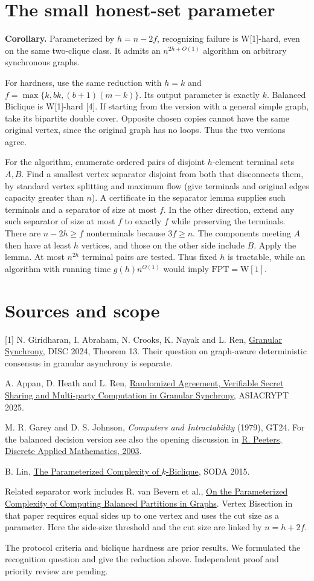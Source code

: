 \documentclass[11pt]{article}
\begin{document}
\section{The small honest-set parameter}
\textbf{Corollary.} Parameterized by $h=n-2f$, recognizing failure is W[1]-hard, even on the same two-clique class. It admits an $n^{2h+O(1)}$ algorithm on arbitrary synchronous graphs.

For hardness, use the same reduction with $h=k$ and
$f=\max\{k,bk,(b+1)(m-k)\}$. Its output parameter is exactly $k$. Balanced Biclique is W[1]-hard [4]. If starting from the version with a general simple graph, take its bipartite double cover. Opposite chosen copies cannot have the same original vertex, since the original graph has no loops. Thus the two versions agree.

For the algorithm, enumerate ordered pairs of disjoint $h$-element terminal sets $A,B$. Find a smallest vertex separator disjoint from both that disconnects them, by standard vertex splitting and maximum flow (give terminals and original edges capacity greater than $n$). A certificate in the separator lemma supplies such terminals and a separator of size at most $f$. In the other direction, extend any such separator of size at most $f$ to exactly $f$ while preserving the terminals. There are $n-2h\ge f$ nonterminals because $3f\ge n$. The components meeting $A$ then have at least $h$ vertices, and those on the other side include $B$. Apply the lemma. At most $n^{2h}$ terminal pairs are tested. Thus fixed $h$ is tractable, while an algorithm with running time $g(h)n^{O(1)}$ would imply $\mathrm{FPT}=\mathrm{W}[1]$.

\section*{Sources and scope}
[1] N. Giridharan, I. Abraham, N. Crooks, K. Nayak and L. Ren, \href{https://doi.org/10.4230/LIPIcs.DISC.2024.30}{Granular Synchrony}, DISC 2024, Theorem 13. Their question on graph-aware deterministic consensus in granular asynchrony is separate.\par
[2] A. Appan, D. Heath and L. Ren, \href{https://doi.org/10.1007/978-981-95-5116-3_1}{Randomized Agreement, Verifiable Secret Sharing and Multi-party Computation in Granular Synchrony}, ASIACRYPT 2025.\par
[3] M. R. Garey and D. S. Johnson, \emph{Computers and Intractability} (1979), GT24. For the balanced decision version see also the opening discussion in \href{https://doi.org/10.1016/S0166-218X(03)00333-0}{R. Peeters, Discrete Applied Mathematics, 2003}.\par
[4] B. Lin, \href{https://doi.org/10.1137/1.9781611973730.41}{The Parameterized Complexity of $k$-Biclique}, SODA 2015.
\par\medskip
 Related separator work includes R. van Bevern et al., \href{https://arxiv.org/abs/1312.7014}{On the Parameterized Complexity of Computing Balanced Partitions in Graphs}. Vertex Bisection in that paper requires equal sides up to one vertex and uses the cut size as a parameter. Here the side-size threshold and the cut size are linked by $n=h+2f$.

The protocol criteria and biclique hardness are prior results. We formulated the recognition question and give the reduction above. Independent proof and priority review are pending.
\end{document}
